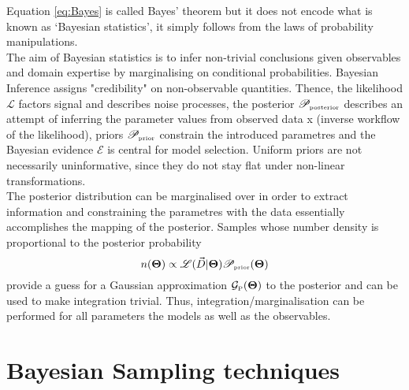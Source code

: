 Equation \ref{eq:Bayes} is called Bayes’ theorem but it does not encode what is known as ‘Bayesian statistics’, it simply follows from the laws of probability manipulations.\\
The aim of Bayesian statistics is to infer non-trivial conclusions given observables and domain expertise by marginalising on conditional probabilities. Bayesian Inference assigns "credibility" on non-observable quantities. Thence, the likelihood $\mathscr{L}$ factors signal and describes noise processes, the posterior $\mathscr{P}_{\mbox{\tiny{posterior}}}$ describes an attempt of inferring the parameter values from observed data x (inverse workflow of the likelihood), priors $\mathscr{P}_{\mbox{\tiny{prior}}}$ constrain the introduced parametres and the Bayesian evidence $\mathscr{E}$ is central for model selection. Uniform priors are not necessarily uninformative, since they do not stay flat under non-linear transformations. \\
The posterior distribution can be marginalised over in order to extract information and constraining the parametres with the data essentially accomplishes the mapping of the posterior. Samples whose number density is proportional to the posterior probability $$n(\mathbf{\Theta}) \propto \mathscr{L}(\vec{D}|\mathbf{\Theta}) \mathscr{P}_{\mbox{\tiny{prior}}}(\mathbf{\Theta}) $$ provide a guess for a Gaussian approximation $\mathcal{G}_{\mbox{\tiny{P}}}(\mathbf{\Theta})$ to the posterior and can be used to make integration trivial. Thus, integration/marginalisation can be performed for all parameters the models as well as the observables.

\section{Bayesian Sampling techniques}

